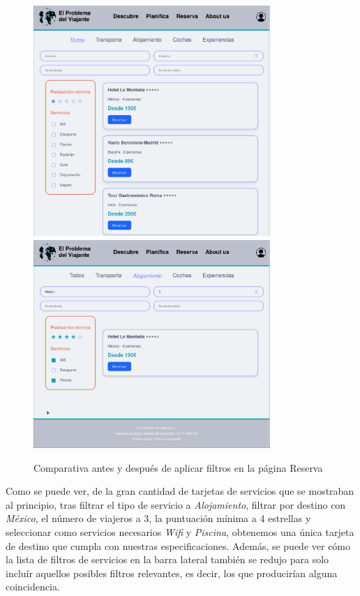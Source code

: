 \documentclass[11pt, a4paper]{book}
\begin{document}
	\begin{figure} [H]
		\centering
        \includegraphics[width=0.8\textwidth]{CSS/5-3 1024.png}
        \includegraphics[width=0.8\textwidth]{CSS/5 extra.png}
		\caption{Comparativa antes y después de aplicar filtros en la página Reserva}
	\end{figure}

    Como se puede ver, de la gran cantidad de tarjetas de servicios que se mostraban al principio, tras filtrar el tipo de servicio a \textit{Alojamiento}, filtrar por destino con \textit{México}, el número de viajeros a 3, la puntuación mínima a 4 estrellas y seleccionar como servicios necesarios \textit{Wifi} y \textit{Piscina}, obtenemos una única tarjeta de destino que cumpla con nuestras especificaciones. Además, se puede ver cómo la lista de filtros de servicios en la barra lateral también se redujo para solo incluír aquellos posibles filtros relevantes, es decir, los que producirían alguna coincidencia.
	
\end{document}
